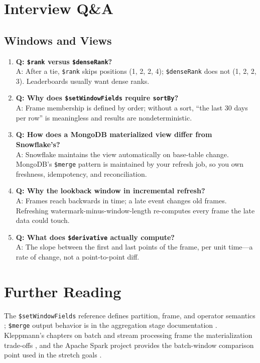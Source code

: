 \section{Interview Q\&A}
\subsection{Windows and Views}
\begin{enumerate}
    \item \textbf{Q: \texttt{\$rank} versus \texttt{\$denseRank}?}\\
    A: After a tie, \texttt{\$rank} skips positions (1, 2, 2, 4); \texttt{\$denseRank} does not (1, 2, 2, 3). Leaderboards usually want dense ranks.

    \item \textbf{Q: Why does \texttt{\$setWindowFields} require \texttt{sortBy}?}\\
    A: Frame membership is defined by order; without a sort, ``the last 30 days per row'' is meaningless and results are nondeterministic.

    \item \textbf{Q: How does a MongoDB materialized view differ from Snowflake's?}\\
    A: Snowflake maintains the view automatically on base-table change. MongoDB's \texttt{\$merge} pattern is maintained by your refresh job, so you own freshness, idempotency, and reconciliation.

    \item \textbf{Q: Why the lookback window in incremental refresh?}\\
    A: Frames reach backwards in time; a late event changes old frames. Refreshing watermark-minus-window-length re-computes every frame the late data could touch.

    \item \textbf{Q: What does \texttt{\$derivative} actually compute?}\\
    A: The slope between the first and last points of the frame, per unit time---a rate of change, not a point-to-point diff.
\end{enumerate}

\section{Further Reading}
The \texttt{\$setWindowFields} reference defines partition, frame, and operator semantics \cite{mongodbSetWindowFieldsDocs}; \texttt{\$merge} output behavior is in the aggregation stage documentation \cite{mongodbMergeDocs,mongodbAggregationDocs}. Kleppmann's chapters on batch and stream processing frame the materialization trade-offs \cite{kleppmann2017ddia}, and the Apache Spark project provides the batch-window comparison point used in the stretch goals \cite{apacheSparkRepo}.


